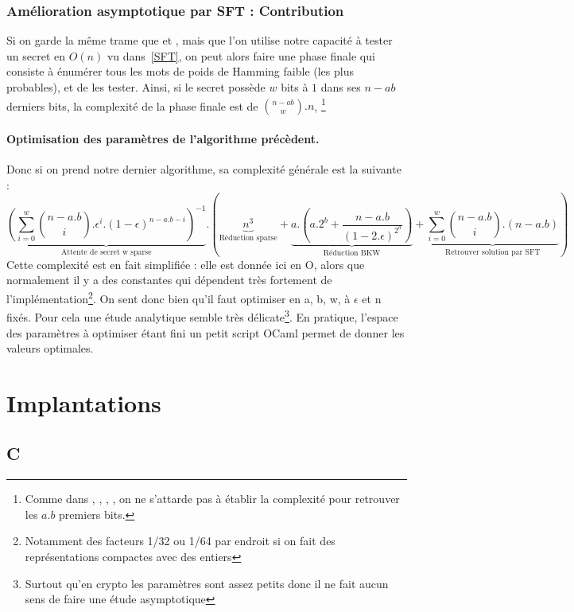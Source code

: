 \documentclass{article}		%
\theoremstyle{definition}
\theoremstyle{plain}
\theoremstyle{plain}
\theoremstyle{plain}
\theoremstyle{plain}
\begin{document}
\subsubsection{Amélioration asymptotique par SFT : Contribution}
Si on garde la même trame que \cite{Kirchner} et \cite{Bernstein}, mais que l'on utilise notre
capacité à tester un secret en $O(n)$ vu dans~\ref{SFT}, on peut alors faire une phase
finale qui consiste à énumérer tous les mots de poids de Hamming faible (les plus
probables), et de les tester. Ainsi, si le secret possède $w$ bits à $1$
dans ses $n-ab$ derniers bits,
la complexité de la phase finale est de $\binom{n-ab}{w}.n$, \footnote{Comme dans
\cite{LF}, \cite{BKW}, \cite{Kirchner}, \cite{Bernstein}, on ne s'attarde
pas à établir la complexité pour retrouver les $a.b$ premiers bits.}

\paragraph{Optimisation des paramètres de l'algorithme précèdent.}
Donc si on prend notre dernier algorithme, sa complexité générale est
la suivante :
$$\underbrace{(\sum_{i=0}^{w}\binom{n-a.b}{i}.\epsilon^i.(1-\epsilon)^{n-a.b-i})^{-1}}_{\text{Attente
de secret w sparse}}.
(\underbrace{n^3}_{\text{Réduction sparse}} +
\underbrace{a.(a.2^b+\frac{n-a.b}{(1-2.\epsilon)^{2^a}})
}_{\text{Réduction BKW}} + \underbrace{\sum_{i=0}^w \binom{n-a.b}{i}.(n-a.b)}_{\text{Retrouver solution par SFT}} )$$ 
Cette complexité est en fait simplifiée : elle est donnée ici en O, alors
que normalement il y a des constantes qui dépendent très fortement de
l'implémentation\footnote{Notamment des facteurs 1/32 ou 1/64 par
endroit si on fait des représentations compactes avec des entiers}. On sent
donc bien qu'il faut optimiser en a, b, w, à $\epsilon$ et n fixés. Pour
cela une étude analytique semble très délicate\footnote{Surtout qu'en
crypto les paramètres sont assez petits donc il ne fait aucun sens de
faire une étude asymptotique}. En pratique, l'espace des paramètres à
optimiser étant fini un petit script OCaml permet de donner les valeurs
optimales. 
\section{Implantations}
\subsection{C}
\end{document}
